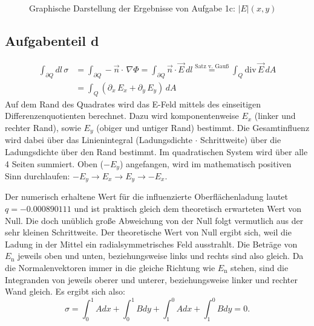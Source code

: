 \begin{landscape}
	\begin{figure}
		\caption{Graphische Darstellung der Ergebnisse von Aufgabe 1c: $|E|(x,y)$}
		\label{fig:cabsE}
	\end{figure}
\end{landscape} 

\subsection*{Aufgabenteil d}
\begin{align}		\int_{\partial Q} dl\,\sigma &= \int_{\partial Q} -\vec{n}\cdot \,\nabla \Phi = \int_{\partial Q} 	\vec{n}\cdot \vec{E}\,dl \stackrel{\text{Satz v. Gauß}}{=} \int_{Q} \text{div}\,\vec{E}\, dA \\
		&= \int_{Q} \left(\partial_x \,E_x+\partial_y\,E_y\right)\, dA 
\end{align}%
Auf dem Rand des Quadrates wird das E-Feld mittels des einseitigen Differenzenquotienten berechnet. Dazu wird komponentenweise $E_x$ (linker und rechter Rand), sowie $E_y$ (obiger und untiger Rand) bestimmt. Die Gesamtinfluenz wird dabei über das Linienintegral (Ladungsdichte $\cdot$ Schrittweite) über die Ladungsdichte über den Rand bestimmt. Im quadratischen System wird über alle 4 Seiten summiert. Oben ($-E_y$) angefangen, wird im mathematisch positiven Sinn durchlaufen: $-E_y \rightarrow E_x \rightarrow E_y \rightarrow -E_x$.

\begin{sloppypar}
Der numerisch erhaltene Wert für die influenzierte Oberflächenladung lautet $q = -0.000890111$ und ist praktisch gleich dem theoretisch erwarteten Wert von Null.
Die doch unüblich große Abweichung von der Null folgt vermutlich aus der sehr kleinen Schrittweite.
Der theoretische Wert von Null ergibt sich, weil die Ladung in der Mittel ein radialsymmetrisches Feld ausstrahlt.
Die Beträge von $E_\text{n}$ jeweils oben und unten, beziehungsweise links und rechts sind also gleich.
Da die Normalenvektoren immer in die gleiche Richtung wie $E_\text{n}$ stehen, sind die Integranden von jeweils oberer und unterer, beziehungsweise linker und rechter Wand gleich.
Es ergibt sich also:
\begin{equation}
    \sigma = \int_0^1 A dx + \int_0^1 B dy + \int_1^0 A dx + \int_1^0 B dy = 0.
\end{equation}
\end{sloppypar}
